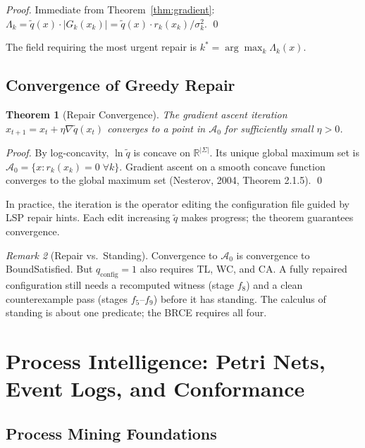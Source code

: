 \documentclass[12pt, letterpaper]{report}
\theoremstyle{plain}
\newtheorem{theorem}{Theorem}[chapter]
\theoremstyle{definition}
\theoremstyle{remark}
\newtheorem{remark}[theorem]{Remark}
\newcommand{\R}{\mathbb{R}}
\newcommand{\qc}{q_{\mathrm{config}}}
\newcommand{\abs}[1]{\left\lvert #1 \right\rvert}
\begin{document}
\begin{proof}
Immediate from Theorem~\ref{thm:gradient}:
$\Lambda_k = \tilde{q}(x) \cdot \abs{G_k(x_k)} = \tilde{q}(x) \cdot r_k(x_k)/\sigma_k^2$. \qed
\end{proof}

The field requiring the most urgent repair is $k^* = \arg\max_k \Lambda_k(x)$.

\section{Convergence of Greedy Repair}

\begin{theorem}[Repair Convergence]
\label{thm:repair}
The gradient ascent iteration $x_{t+1} = x_t + \eta \nabla\tilde{q}(x_t)$
converges to a point in $\mathcal{A}_0$ for sufficiently small $\eta > 0$.
\end{theorem}

\begin{proof}
By log-concavity, $\ln\tilde{q}$ is concave on $\R^{|\Sigma|}$.
Its unique global maximum set is $\mathcal{A}_0 = \{x : r_k(x_k) = 0\; \forall k\}$.
Gradient ascent on a smooth concave function converges to the global maximum
set (Nesterov, 2004, Theorem 2.1.5). \qed
\end{proof}

In practice, the iteration is the operator editing the configuration file
guided by LSP repair hints. Each edit increasing $\tilde{q}$ makes progress;
the theorem guarantees convergence.

\begin{remark}[Repair vs.\ Standing]
Convergence to $\mathcal{A}_0$ is convergence to BoundSatisfied.
But $\qc = 1$ also requires TL, WC, and CA.
A fully repaired configuration still needs a recomputed witness (stage $f_8$)
and a clean counterexample pass (stages $f_5$--$f_9$) before it has standing.
The calculus of standing is about one predicate; the BRCE requires all four.
\end{remark}

\chapter{Process Intelligence: Petri Nets, Event Logs, and Conformance}
\label{ch:process}

\section{Process Mining Foundations}
\end{document}
